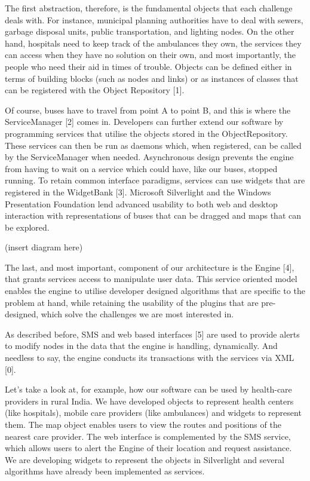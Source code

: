\documentclass{report}
\begin{document}
The first abstraction, therefore, is the fundamental objects that each challenge deals with.  For instance, municipal planning authorities have to deal with sewers, garbage disposal units, public transportation, and lighting nodes.  On the other hand, hospitals need to keep track of the ambulances they own, the services they can access when they have no solution on their own, and most importantly, the people who need their aid in times of trouble.  Objects can be defined either in terms of building blocks (such as nodes and links) or as instances of classes that can be registered with the Object Repository [1]. 

Of course, buses have to travel from point A to point B, and this is where the ServiceManager [2] comes in.  Developers can further extend our software by programming services that utilise the objects stored in the ObjectRepository.  These services can then be run as daemons which, when registered, can be called by the ServiceManager when needed.  Asynchronous design prevents the engine from having to wait on a service which could have, like our buses, stopped running.  To retain common interface paradigms, services can use widgets that are registered in the WidgetBank [3].  Microsoft Silverlight and the Windows Presentation Foundation lend advanced usability to both web and desktop interaction with representations of buses that can be dragged and maps that can be explored.

(insert diagram here)

\newpage
The last, and most important, component of our architecture is the Engine [4], that grants services access to manipulate user data.  This service oriented model enables the engine to utilise developer designed algorithms that are specific to the problem at hand, while retaining the usability of the plugins that are pre-designed, which solve the challenges we are most interested in.

As described before, SMS and web based interfaces [5] are used to provide alerts to modify nodes in the data that the engine is handling, dynamically.  And needless to say, the engine conducts its transactions with the services via XML [0].

Let's take a look at, for example, how our software can be used by health-care providers in rural India.  We have developed objects to represent health centers (like hospitals), mobile care providers (like ambulances) and widgets to represent them.  The map object enables users to view the routes and positions of the nearest care provider.  The web interface is complemented by the SMS service, which allows users to alert the Engine of their location and request assistance.  We are developing widgets to represent the objects in Silverlight and several algorithms have already been implemented as services.
\end{document}
